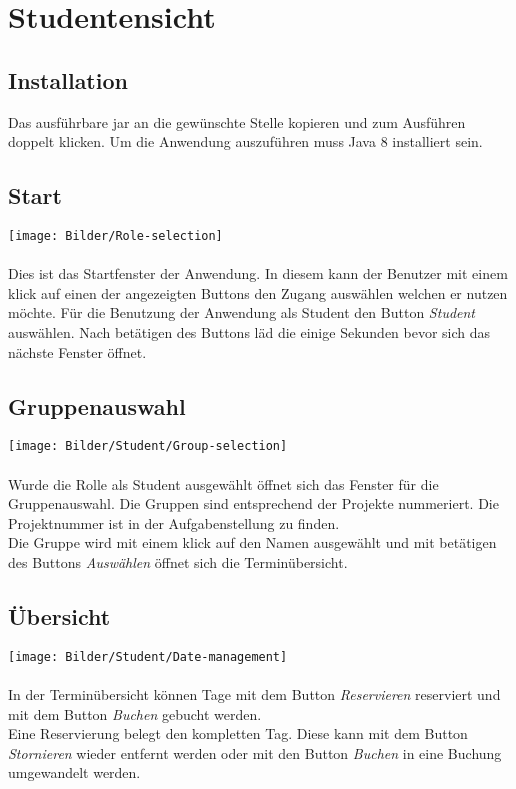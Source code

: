 \section{Studentensicht}

\subsection{Installation}
Das ausführbare jar an die gewünschte Stelle kopieren und zum Ausführen doppelt klicken.
Um die Anwendung auszuführen muss Java 8 installiert sein. 

\subsection{Start}
\texttt{[image: Bilder/Role-selection]}
\\
\\
Dies ist das Startfenster der Anwendung. In diesem kann der Benutzer mit einem klick auf einen der angezeigten Buttons den Zugang auswählen welchen er nutzen möchte. Für die Benutzung der Anwendung als Student den Button \textit{Student} auswählen. Nach betätigen des Buttons läd die einige Sekunden bevor sich das nächste Fenster öffnet.


\subsection{Gruppenauswahl}
\texttt{[image: Bilder/Student/Group-selection]}
\\
\\
Wurde die Rolle als Student ausgewählt öffnet sich das Fenster für die Gruppenauswahl. Die Gruppen sind entsprechend der Projekte nummeriert. Die Projektnummer ist in der Aufgabenstellung zu finden. 
\\
Die Gruppe wird mit einem klick auf den Namen ausgewählt und mit betätigen des Buttons \textit{Auswählen} öffnet sich die Terminübersicht.

\subsection{Übersicht}
\texttt{[image: Bilder/Student/Date-management]}
\\
\\
In der Terminübersicht können Tage mit dem Button \textit{Reservieren} reserviert und mit dem Button \textit{Buchen} gebucht werden. 
\\
Eine Reservierung belegt den kompletten Tag. Diese kann mit dem Button \textit{Stornieren} wieder entfernt werden oder mit den Button \textit{Buchen} in eine Buchung umgewandelt werden.

